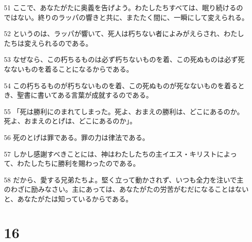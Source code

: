 \par 51 ここで、あなたがたに奥義を告げよう。わたしたちすべては、眠り続けるのではない。終りのラッパの響きと共に、またたく間に、一瞬にして変えられる。
\par 52 というのは、ラッパが響いて、死人は朽ちない者によみがえらされ、わたしたちは変えられるのである。
\par 53 なぜなら、この朽ちるものは必ず朽ちないものを着、この死ぬものは必ず死なないものを着ることになるからである。
\par 54 この朽ちるものが朽ちないものを着、この死ぬものが死なないものを着るとき、聖書に書いてある言葉が成就するのである。
\par 55 「死は勝利にのまれてしまった。死よ、おまえの勝利は、どこにあるのか。死よ、おまえのとげは、どこにあるのか」。
\par 56 死のとげは罪である。罪の力は律法である。
\par 57 しかし感謝すべきことには、神はわたしたちの主イエス・キリストによって、わたしたちに勝利を賜わったのである。
\par 58 だから、愛する兄弟たちよ。堅く立って動かされず、いつも全力を注いで主のわざに励みなさい。主にあっては、あなたがたの労苦がむだになることはないと、あなたがたは知っているからである。

\chapter{16}

